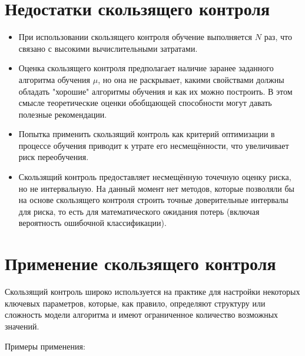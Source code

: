 \section{Недостатки скользящего контроля}
\begin{itemize}
\item При использовании скользящего контроля обучение выполняется \( N \) раз, что связано с высокими вычислительными затратами. 
\item Оценка скользящего контроля предполагает наличие заранее заданного алгоритма обучения \( \mu \), но она не раскрывает, какими свойствами должны обладать "хорошие" алгоритмы обучения и как их можно построить. В этом смысле теоретические оценки обобщающей способности могут давать полезные рекомендации.

\item Попытка применить скользящий контроль как критерий оптимизации в процессе обучения приводит к утрате его несмещённости, что увеличивает риск переобучения. 
\item Скользящий контроль предоставляет несмещённую точечную оценку риска, но не интервальную. На данный момент нет методов, которые позволяли бы на основе скользящего контроля строить точные доверительные интервалы для риска, то есть для математического ожидания потерь (включая вероятность ошибочной классификации).
\end{itemize}

\section{Применение скользящего контроля}

Скользящий контроль широко используется на практике для настройки некоторых ключевых параметров, которые, как правило, определяют структуру или сложность модели алгоритма и имеют ограниченное количество возможных значений.

Примеры применения:

